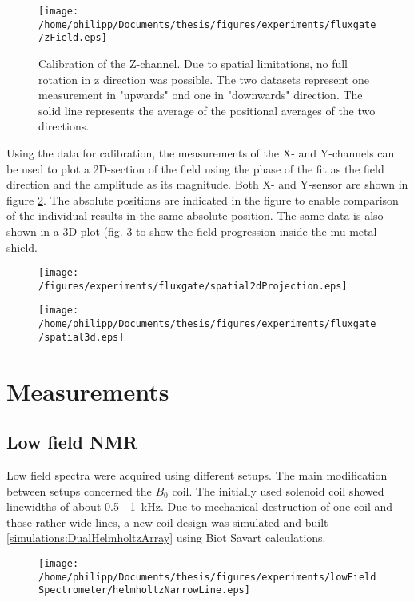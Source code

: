         \begin{figure}[h]
            \label{fig:results:fluxgate:zcal}
            \centering
            \texttt{[image: /home/philipp/Documents/thesis/figures/experiments/fluxgate/zField.eps]}
            \caption[calibration results Z]{Calibration of the Z-channel. Due to spatial limitations, no full rotation in z direction was possible. The two datasets represent one measurement in "upwards" ond one in "downwards" direction. The solid line represents the average of the positional averages of the two directions.}
        \end{figure}
        Using the data for calibration, the measurements of the X- and Y-channels can be used to plot a 2D-section of the field using the phase of the fit as the field direction and the amplitude as its magnitude. Both X- and Y-sensor are shown in figure \ref{fig:results:fluxgate:plotSpatial2d}. The absolute positions are indicated in the figure to enable comparison of the individual results in the same absolute position. The same data is also shown in a 3D plot (fig. \ref{fig:results:fluxgate:plotSpatial3d} to show the field progression inside the mu metal shield.
        \begin{figure}[t]
            \label{fig:results:fluxgate:plotSpatial2d}
            \centering
            \texttt{[image: /figures/experiments/fluxgate/spatial2dProjection.eps]}
        \end{figure}
        \begin{figure}[t]
            \label{fig:results:fluxgate:plotSpatial3d}
            \centering
            \texttt{[image: /home/philipp/Documents/thesis/figures/experiments/fluxgate/spatial3d.eps]}
        \end{figure}
\section{Measurements}
    \subsection{Low field NMR}
    Low field spectra were acquired using different setups. The main modification between setups concerned the $B_0$ coil. The initially used solenoid coil showed linewidths of about 0.5 - \SI{1}{\kilo\hertz}. Due to mechanical destruction of one coil and those rather wide lines, a new coil design was simulated and built \ref{simulations:DualHelmholtzArray} using Biot Savart calculations.
    \begin{figure}[h] 
        \centering
    \end{figure}
    \begin{figure}[h]
        \centering
        \texttt{[image: /home/philipp/Documents/thesis/figures/experiments/lowFieldSpectrometer/helmholtzNarrowLine.eps]}
    \end{figure}
